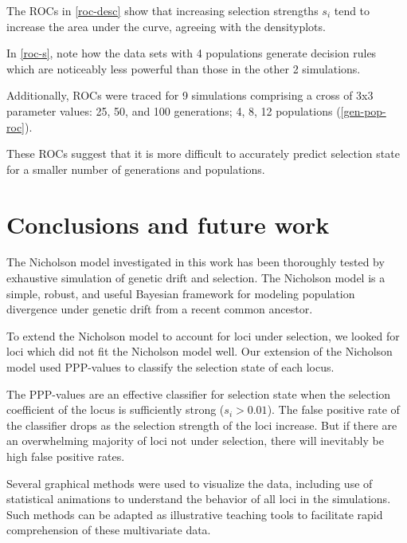 \documentclass[a4paper,12pt]{article}
\begin{document}
The ROCs in \autoref{roc-desc} show that increasing selection
strengths $s_i$ tend to increase the area under the curve, agreeing
with the densityplots.

In \autoref{roc-s}, note how the data sets with 4 populations generate
decision rules which are noticeably less powerful than those in the
other 2 simulations.

Additionally, ROCs were traced for 9 simulations comprising a cross of
3x3 parameter values: 25, 50, and 100 generations; 4, 8, 12
populations (\autoref{gen-pop-roc}).


These ROCs suggest that it is more difficult to accurately predict
selection state for a smaller number of generations and populations.

\section{Conclusions and future work}

The Nicholson model investigated in this work has been thoroughly
tested by exhaustive simulation of genetic drift and selection. The
Nicholson model is a simple, robust, and useful Bayesian framework for
modeling population divergence under genetic drift from a recent
common ancestor.

To extend the Nicholson model to account for loci under selection, we
looked for loci which did not fit the Nicholson model well. Our
extension of the Nicholson model used PPP-values to classify the
selection state of each locus.

The PPP-values are an effective classifier for selection state when
the selection coefficient of the locus is sufficiently strong
($s_i>0.01$). The false positive rate of the classifier drops as the
selection strength of the loci increase. But if there are an
overwhelming majority of loci not under selection, there will
inevitably be high false positive rates.

Several graphical methods were used to visualize the data, including
use of statistical animations to understand the behavior of all loci
in the simulations. Such methods can be adapted as illustrative
teaching tools to facilitate rapid comprehension of these multivariate
data.
\end{document}
